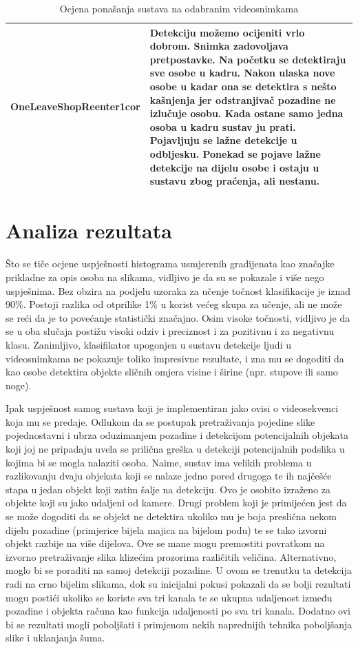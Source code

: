 \documentclass[utf8, seminar, numeric, times]{fer}
\begin{document}
\begin{table}
\begin{center}
\begin{tabular}{|c|p{10cm}|}
OneLeaveShopReenter1cor & Detekciju možemo ocijeniti vrlo dobrom. Snimka zadovoljava pretpostavke. Na početku se detektiraju sve osobe u kadru. Nakon ulaska nove osobe u kadar ona se detektira s nešto kašnjenja jer odstranjivač pozadine ne izlučuje osobu. Kada ostane samo jedna osoba u kadru sustav ju prati. Pojavljuju se lažne detekcije u odbljesku. Ponekad se pojave lažne detekcije 
na dijelu osobe i ostaju u sustavu zbog praćenja, ali nestanu.  \\ \hline
\end{tabular}
\end{center}
\caption{Ocjena ponašanja sustava na odabranim videosnimkama}
\label{videores}
\end{table}


\section{Analiza rezultata}
Što se tiče ocjene uspješnosti histograma usmjerenih gradijenata kao značajke prikladne za opis osoba na slikama, vidljivo je da su se pokazale i više nego uspješnima. Bez obzira na podjelu uzoraka za učenje točnost klasifikacije je iznad 90\%. Postoji razlika od  otprilike 1\% u korist većeg skupa za učenje, ali ne može se reći da je to povećanje statistički značajno. Osim visoke točnosti, vidljivo je da se u oba slučaja postižu visoki odziv i preciznost i za pozitivnu i za negativnu klasu. Zanimljivo, klasifikator upogonjen u sustavu detekcije ljudi u videosnimkama ne pokazuje toliko impresivne rezultate, i zna mu se dogoditi da kao osobe detektira objekte sličnih omjera visine i širine (npr. stupove ili samo noge).

Ipak uspješnost samog sustava koji je implementiran jako ovisi o videosekvenci koja mu se predaje.  Odlukom da se postupak pretraživanja pojedine slike pojednostavni i ubrza oduzimanjem pozadine i detekcijom potencijalnih objekata koji joj ne pripadaju uvela se prilična greška u detekciji potencijalnih podslika u kojima bi se mogla nalaziti osoba. Naime, sustav ima velikih problema u razlikovanju dvaju objekata koji se nalaze jedno pored drugoga te ih najčešće stapa u jedan objekt koji zatim šalje na detekciju. Ovo je osobito izraženo za objekte koji su jako udaljeni od kamere. Drugi problem koji je primijećen jest da se može dogoditi da se objekt ne detektira ukoliko mu je boja preslična nekom dijelu pozadine (primjerice bijela majica na bijelom podu) te se tako izvorni objekt razbije na više dijelova. Ove se mane mogu premostiti povratkom na izvorno pretraživanje slika klizećim prozorima različitih veličina. Alternativno, moglo bi se poraditi na samoj detekciji pozadine. U ovom se trenutku ta detekcija radi na crno bijelim slikama, dok su inicijalni pokusi pokazali da se bolji rezultati mogu postići ukoliko se koriste sva tri kanala te se ukupna udaljenost između pozadine i objekta računa kao funkcija udaljenosti po sva tri kanala. Dodatno ovi bi se rezultati mogli poboljšati i primjenom nekih naprednijih tehnika poboljšanja slike i uklanjanja šuma.
\end{document}
